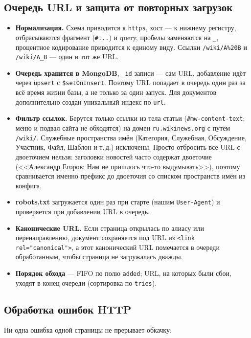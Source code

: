 \subsection{Очередь URL и защита от повторных загрузок}
\begin{itemize}
    \item \textbf{Нормализация.} Схема приводится к \texttt{https}, хост ---
    к нижнему регистру, отбрасываются фрагмент (\texttt{\#...}) и query,
    пробелы заменяются на \texttt{\_}, процентное кодирование приводится к
    единому виду. Ссылки \texttt{/wiki/A\%20B} и \texttt{/wiki/A\_B} ---
    один и тот же URL.
    \item \textbf{Очередь хранится в MongoDB}, \texttt{\_id} записи --- сам
    URL, добавление идёт через \texttt{upsert} с \texttt{\$setOnInsert}.
    Поэтому URL попадает в очередь один раз за всё время жизни базы, а не
    только за один запуск. Для документов дополнительно создан уникальный индекс
    по \texttt{url}.
    \item \textbf{Фильтр ссылок.} Берутся только ссылки из тела статьи
    (\texttt{\#mw-content-text}; меню и подвал сайта не обходятся) на домен
    \texttt{ru.wikinews.org} с путём \texttt{/wiki/}. Служебные пространства
    имён (Категория, Служебная, Обсуждение, Участник, Файл, Шаблон и т.\,д.)
    исключены. Просто отбросить все URL с двоеточием нельзя: заголовки
    новостей часто содержат двоеточие (<<Александр Егоров: Нам не пришлось
    что-то выдумывать>>), поэтому сравнивается именно префикс до двоеточия со
    списком пространств имён из конфига.
    \item \textbf{robots.txt} загружается один раз при старте (нашим
    \texttt{User-Agent}) и проверяется при добавлении URL в очередь.
    \item \textbf{Канонические URL.} Если страница открылась по алиасу или
    перенаправлению, документ сохраняется под URL из
    \texttt{<link rel="canonical">}, а этот канонический URL помечается в очереди
    обработанным, чтобы страница не загружалась дважды.
    \item \textbf{Порядок обхода} --- FIFO по полю \texttt{added}; URL, на
    которых были сбои, уходят в конец очереди (сортировка по \texttt{tries}).
\end{itemize}

\subsection{Обработка ошибок HTTP}
Ни одна ошибка одной страницы не прерывает обкачку:

